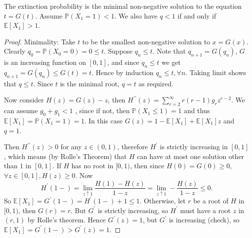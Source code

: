 \begin{theorem}
    The extinction probability is the minimal non-negative solution to the equation $t=G(t)$. Assume $ \mathbb{P}(X_1=1)<1 $. We also have $ q<1 $ if and only if $ \mathbb{E}[X_1]>1 $.
\end{theorem}
\begin{proof}
    Minimality: Take $t$ to be the smallest non-negative solution to $x=G(x)$. Clearly $ q_0=\mathbb{P}(X_0=0)=0\le t $. Suppose $ q_n\le t $. Note that $q_{n+1}=G(q_n)$, $G$ is an increasing function on $[0,1]$, and since $ q_n\le t $ we get $ q_{n+1}=G(q_n)\le G(t)=t $. Hence by induction $ q_n\le t,\forall n $. Taking limit shows that $ q\le t $. Since $t$ is the minimal root, $ q=t $ as required.

    Now consider $H(z)=G(z)-z$, then $H^{\prime\prime}(z)=\sum_{r=2}^\infty r(r-1)g_rz^{r-2}$.
    We can assume $g_0+g_1<1$ , since if not, then $ \mathbb{P}(X_1\le 1)=1 $ and thus $ \mathbb{E}[X_1]=\mathbb{P}(X_1=1)=1 $. In this case $ G(z)=1-\mathbb{E}[X_1]+\mathbb{E}[X_1]z $ and $ q=1 $.

    Then $H^{\prime\prime}(z)>0$ for any $z\in (0,1)$, therefore $H^\prime$ is strictly increasing in $[0,1]$, which means (by Rolle's Theorem) that $H$ can have at most one solution other than $1$ in $[0,1]$.
    If $H$ has no root in $[0,1)$, then since $H(0)=G(0)\ge 0$, $\forall z\in [0,1],H(z)\ge 0$.
    Now
    $$H^\prime(1-)=\lim_{z \uparrow 1}\frac{H(1)-H(z)}{1-z}=\lim_{z \uparrow 1}-\frac{H(z)}{1-z}\le 0.$$
    So $\mathbb{E}[X_1]=G^\prime(1-)=H^\prime(1-)+1\le1$.
    Otherwise, let $r$ be a root of $H$ in $[0,1)$, then $G(r)=r$.
    But $G^\prime$ is strictly increasing, so $H^\prime$ must have a root $z$ in $(r,1)$ by Rolle's theorem.
    Hence $G^\prime(z)=1$, but $G^\prime$ is increasing (check), so $\mathbb{E}[X_1]=G^\prime(1-)>G^\prime(z)=1$.
\end{proof}